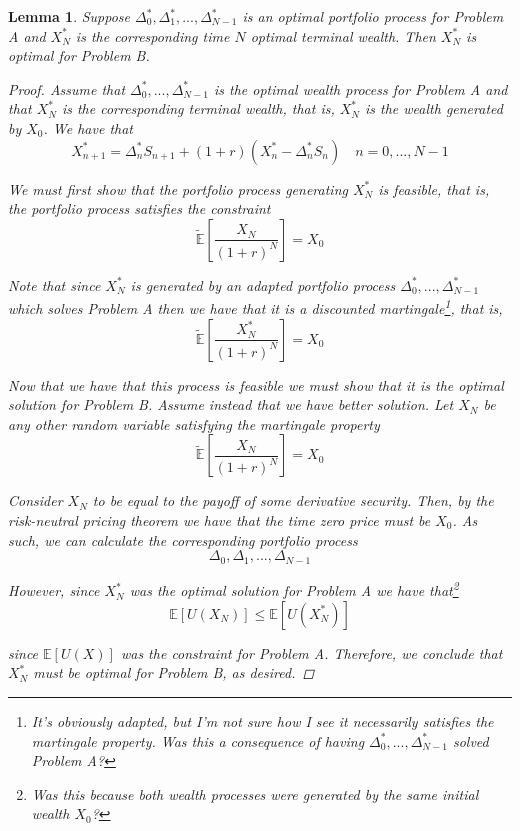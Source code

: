 \documentclass[12pt]{article}
\newtheorem{lemma}{Lemma}
\newlength\tindent
\renewcommand{\indent}{\hspace*{\tindent}}
\newcommand{\E}{\mathbb E}
\begin{document}
\begin{lemma} Suppose $\Delta^*_0, \Delta^*_1,...,\Delta^*_{N - 1}$ is an optimal portfolio process for Problem A and $X^*_N$ is the corresponding time $N$ optimal terminal wealth. Then $X^*_N$ is optimal for Problem B.

\begin{proof} Assume that $\Delta^*_0, ..., \Delta^*_{N - 1}$ is the optimal wealth process for Problem A and that $X^*_N$ is the corresponding terminal wealth, that is, $X^*_N$ is the wealth generated by $X_0$. We have that
\begin{equation*}
	X^*_{n + 1} = \Delta^*_nS_{n + 1} + (1 + r)(X^*_n - \Delta^*_nS_n) \quad n = 0,..., N - 1
\end{equation*}

\indent We must first show that the portfolio process generating $X^*_N$ is feasible, that is, the portfolio process satisfies the constraint
\begin{equation*}
	\tilde{\E} \left[ \frac{X_N}{(1 + r)^N} \right] = X_0
\end{equation*}

\indent Note that since $X^*_N$ is generated by an adapted portfolio process $\Delta^*_0,...,\Delta^*_{N - 1}$ which solves Problem A then we have that it is a discounted martingale\footnote{It's obviously adapted, but I'm not sure how I see it necessarily satisfies the martingale property. Was this a consequence of having $\Delta^*_0,..., \Delta^*_{N - 1}$ solved Problem A?}, that is,
\begin{equation*}
	\tilde{\E} \left[ \frac{X^*_N}{(1 + r)^N} \right] = X_0
\end{equation*}

\indent Now that we have that this process is feasible we must show that it is the optimal solution for Problem B. Assume instead that we have better solution. Let $X_N$ be any other random variable satisfying the martingale property
\begin{equation*}
	\tilde{\E} \left[ \frac{X_N}{(1 + r)^N} \right] = X_0
\end{equation*}

\indent Consider $X_N$ to be equal to the payoff of some derivative security. Then, by the risk-neutral pricing theorem we have that the time zero price must be $X_0$. As such, we can calculate the corresponding portfolio process 
\begin{equation*}
	\Delta_0, \Delta_1, ..., \Delta_{N - 1}
\end{equation*}

However, since $X^*_N$ was the optimal solution for Problem A we have that\footnote{Was this because both wealth processes were generated by the same initial wealth $X_0$?}
\begin{equation*}
	\E[U(X_N)] \leq \E[U(X^*_N)]
\end{equation*}

since $\E[U(X)]$ was the constraint for Problem A. Therefore, we conclude that $X^*_N$ must be optimal for Problem B, as desired.
\end{proof}
\end{lemma}
\end{document}
